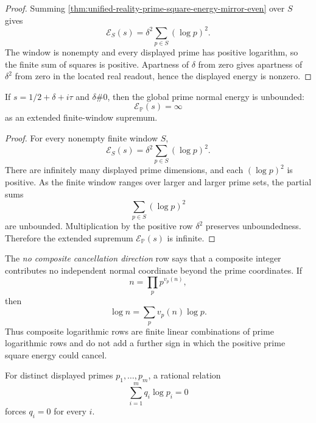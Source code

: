 \begin{proof}
Summing \autoref{thm:unified-reality-prime-square-energy-mirror-even}
over $S$ gives
$$
\mathcal E_S(s)
=
\delta^2\sum_{p\in S}(\log p)^2.
$$
The window is nonempty and every displayed prime has positive logarithm,
so the finite sum of squares is positive.  Apartness of $\delta$ from
zero gives apartness of $\delta^2$ from zero in the located real readout,
hence the displayed energy is nonzero.
\end{proof}

\begin{theorem}
\label{thm:unified-reality-global-prime-square-energy-diverges-off-half}
If $s=1/2+\delta+i\tau$ and $\delta\#0$, then the global prime normal
energy is unbounded:
$$
\mathcal E_{\mathbb P}(s)=\infty
$$
as an extended finite-window supremum.
\end{theorem}

\begin{proof}
For every nonempty finite window $S$,
$$
\mathcal E_S(s)
=
\delta^2\sum_{p\in S}(\log p)^2.
$$
There are infinitely many displayed prime dimensions, and each
$(\log p)^2$ is positive.  As the finite window ranges over larger and
larger prime sets, the partial sums
$$
\sum_{p\in S}(\log p)^2
$$
are unbounded.  Multiplication by the positive row $\delta^2$ preserves
unboundedness.  Therefore the extended supremum
$\mathcal E_{\mathbb P}(s)$ is infinite.
\end{proof}

\begin{definition}
\label{def:unified-reality-composite-rows-add-no-cancellation-direction}
The \emph{no composite cancellation direction} row says that a composite
integer contributes no independent normal coordinate beyond the prime
coordinates.  If
$$
n=\prod_{p}p^{v_p(n)},
$$
then
$$
\log n=\sum_{p}v_p(n)\log p.
$$
Thus composite logarithmic rows are finite linear combinations of prime
logarithmic rows and do not add a further sign in which the positive
prime square energy could cancel.
\end{definition}

\begin{theorem}
\label{thm:unified-reality-prime-logarithmic-directions-independent}
For distinct displayed primes $p_1,\ldots,p_m$, a rational relation
$$
\sum_{i=1}^{m}q_i\log p_i=0
$$
forces $q_i=0$ for every $i$.
\end{theorem}

